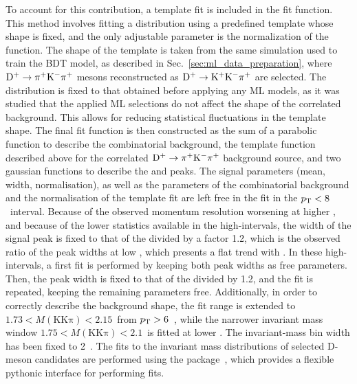 To account for this contribution, a template fit is included in the fit function. This method involves fitting a distribution using a predefined template whose shape is fixed, and the only adjustable parameter is the normalization of the function. The shape of the template is taken from the same simulation used to train the BDT model, as described in Sec.~\ref{sec:ml_data_preparation}, where $\mathrm{D^+}\rightarrow\mathrm{\pi^+K^-\pi^+}$ mesons reconstructed as $\mathrm{D^+}\rightarrow\mathrm{K^+K^-\pi^+}$ are selected. The distribution is fixed to that obtained before applying any ML models, as it was studied that the applied ML selections do not affect the shape of the correlated background. This allows for reducing statistical fluctuations in the template shape. The final fit function is then constructed as the sum of a parabolic function to describe the combinatorial background, the template function described above for the correlated $\mathrm{D^+}\rightarrow\mathrm{\pi^+K^-\pi^+}$ background source, and two gaussian functions to describe the \ds and \dpl peaks. The signal parameters (mean, width, normalisation), as well as the parameters of the combinatorial background and the normalisation of the template fit are left free in the fit in the $p_\mathrm{T}<8$~\gevc interval. Because of the observed momentum resolution worsening at higher \pt, and because of the lower statistics available in the high-\pt intervals, the width of the \dpl signal peak is fixed to that of the \ds divided by a factor 1.2, which is the observed ratio of the peak widths at low \pt, which presents a flat trend with \pt. In these high-\pt intervals, a first fit is performed by keeping both peak widths as free parameters. Then, the \dpl peak width is fixed to that of the \ds divided by 1.2, and the fit is repeated, keeping the remaining parameters free. Additionally, in order to correctly describe the background shape, the fit range is extended to $1.73<M(\mathrm{KK\pi})<2.15$~\gevcc from $p_\mathrm{T}>6$~\gevc, while the narrower invariant mass window $1.75<M(\mathrm{KK\pi})<2.1$~\gevcc is fitted at lower \pt. The invariant-mass bin width has been fixed to 2~\mevcc. The fits to the invariant mass distributions of selected D-meson candidates are performed using the  package~\cite{grosa_2023_7579657}, which provides a flexible pythonic interface for performing fits. 


